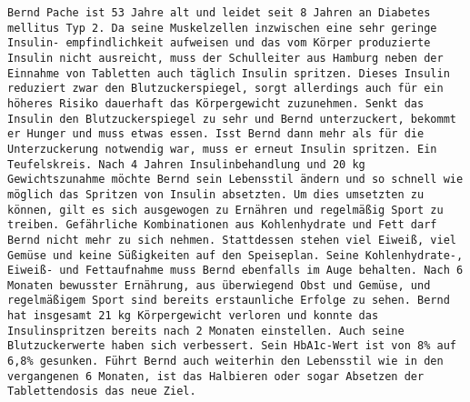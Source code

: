 		    \texttt{Bernd Pache ist 53 Jahre alt und leidet seit 8 Jahren an Diabetes mellitus \newline
		    	Typ 2. Da seine Muskelzellen inzwischen eine sehr geringe Insulin-\newline
		    	empfindlichkeit aufweisen und das vom Körper produzierte \newline
		    	Insulin nicht ausreicht, muss der Schulleiter aus Hamburg neben der \newline
		    	Einnahme von Tabletten auch täglich Insulin spritzen. Dieses Insulin \newline
		    	reduziert zwar den Blutzuckerspiegel, sorgt allerdings auch für ein \newline
		    	höheres Risiko dauerhaft das Körpergewicht zuzunehmen. Senkt das \newline
		    	Insulin den Blutzuckerspiegel zu sehr und Bernd unterzuckert, \newline
		    	bekommt er Hunger und muss etwas essen. Isst Bernd dann mehr\newline
		    	als für die Unterzuckerung notwendig war, muss er erneut Insulin spritzen.\newline
		    	Ein Teufelskreis. Nach 4 Jahren Insulinbehandlung und 20 kg \newline
		    	Gewichtszunahme möchte Bernd sein Lebensstil ändern und so \newline
		    	schnell wie möglich das Spritzen von Insulin absetzten. Um dies umsetzten\newline
		    	zu können, gilt es sich ausgewogen zu Ernähren und regelmäßig Sport zu \newline
		    	treiben. Gefährliche Kombinationen aus Kohlenhydrate und Fett darf Bernd \newline
		    	nicht mehr zu sich nehmen. Stattdessen stehen viel Eiweiß, viel Gemüse \newline
		    	und keine Süßigkeiten auf den Speiseplan. Seine Kohlenhydrate-, \newline
		    	Eiweiß- und Fettaufnahme muss Bernd ebenfalls im Auge behalten. \newline
		    	Nach 6 Monaten bewusster Ernährung, aus überwiegend Obst und Gemüse,\newline
		    	und regelmäßigem Sport sind bereits erstaunliche Erfolge zu sehen. \newline
		    	Bernd hat insgesamt 21 kg Körpergewicht	verloren und konnte das \newline
		    	Insulinspritzen bereits nach 2 Monaten einstellen. Auch seine \newline
		    	Blutzuckerwerte haben sich verbessert. Sein HbA1c-Wert ist \newline
		    	von 8\% auf 6,8\% gesunken. Führt Bernd auch weiterhin den Lebensstil \newline
		    	wie in den vergangenen 6 Monaten, ist das Halbieren oder sogar \newline
		    	Absetzen der Tablettendosis das neue Ziel.}
	
